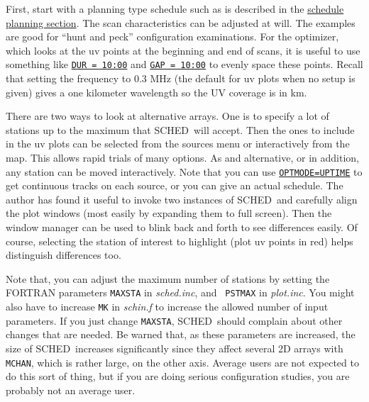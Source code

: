 \documentclass{report}
\newcommand{\schedb}{{\sc SCHED~}}
\begin{document}
First, start with a planning type schedule such as is described in the
{\hyperref[SEC:PLANNING]{schedule planning section}}.  The scan
characteristics can be adjusted at will.  The examples are good for
``hunt and peck'' configuration examinations.  For the optimizer,
which looks at the uv points at the beginning and end of scans, it is
useful to use something like 
{\hyperref[MP:DUR]{{\tt DUR = 10:00}}} and
{\hyperref[MP:GAP]{{\tt GAP = 10:00}}} to evenly space these points.
Recall that setting the frequency to 0.3 MHz (the default for uv plots
when no setup is given) gives a one kilometer wavelength so the UV
coverage is in km.

There are two ways to look at alternative arrays.  One is to specify a
lot of stations up to the maximum that \schedb will accept.  Then the
ones to include in the uv plots can be selected from the sources menu
or interactively from the map.  This allows rapid trials of many
options.  As and alternative, or in addition, any station can be moved
interactively.  Note that you can use 
{\hyperref[MP:OPTMODE]{{\tt OPTMODE=UPTIME}}}
to get continuous tracks on each source, or
you can give an actual schedule.  The author has found it useful to
invoke two instances of \schedb and carefully align the plot windows
(most easily by expanding them to full screen).  Then the window
manager can be used to blink back and forth to see differences easily.
Of course, selecting the station of interest to highlight (plot uv
points in red) helps distinguish differences too.

Note that, you can adjust the maximum number of stations by setting
the FORTRAN parameters {\tt MAXSTA} in {\sl sched.inc}, and {\tt
PSTMAX} in {\sl plot.inc}.  You might also have to increase {\tt MK} in
{\sl schin.f} to increase the allowed number of input parameters.  If
you just change {\tt MAXSTA}, \schedb should complain about other
changes that are needed.  Be warned that, as these parameters are
increased, the size of \schedb increases significantly since they
affect several 2D arrays with {\tt MCHAN}, which is rather large, on
the other axis.  Average users are not expected to do this sort of
thing, but if you are doing serious configuration studies, you are
probably not an average user.
\end{document}
